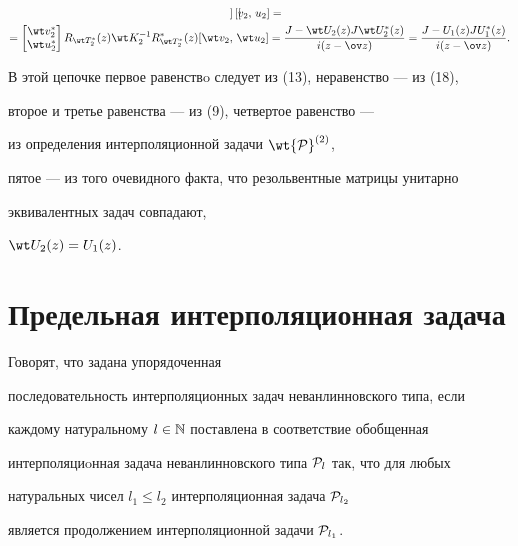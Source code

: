 \begin{pf}
\begin{gather*}
\begin{bmatrix}
\end{bmatrix}


[v_2,\, u_2]= \\


%


= \begin{bmatrix} \wt v_2^* \\ \wt u_2^* \end{bmatrix}


R_{\wt T_2^*}(z)\wt K_2^{-1}


R_{\wt T_2^*}^*(z)[\wt v_2,\, \wt u_2]


= \frac{J-\wt U_2(z)J\wt U_2^*(z)}{i(z-\ov z)}=


\frac{J- U_1(z)J U_1^*(z)}{i(z-\ov z)}.


\end{gather*}


В этой цепочке первое равенствo следует из (13), неравенство --- из (18),


второе и третье равенства --- из (9), четвертое равенство ---


из определения интерполяционной задачи $\wt {\cal P}^{(2)}$,


пятое --- из того очевидного факта, что резольвентные матрицы унитарно


эквивалентных задач совпадают,


$\wt U_2(z)=U_1(z)$.


\end{pf}








\section{Предельная интерполяционная задача}





\begin{defn}


Говорят, что задана упорядоченная


последовательность интерполяционных задач неванлинновского типа, если


каждому натуральному $l\in {\Bbb N}$ поставлена в соответствие обобщенная


интерполяциoнная задача неванлинновского типа ${\cal P}_l$ так, что для любых


натуральных чисел $l_1\leq l_2$ интерполяционная задача ${\cal P}_{l_2}$


является продолжением интерполяционной задачи ${\cal P}_{l_1}$.


\end{defn}





